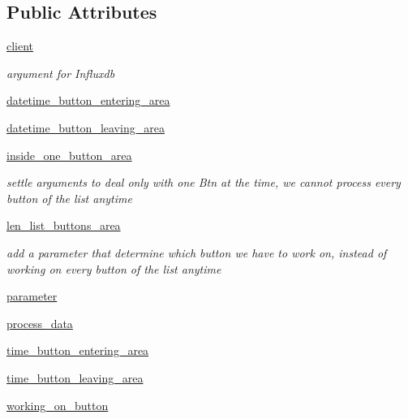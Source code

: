 \subsection*{Public Attributes}
\begin{DoxyCompactItemize}
\item 
\hyperlink{classRET__data__processing_1_1RET__data__processing_ad5bc32b75da65fe60067f501a4bb6665}{client}
\begin{DoxyCompactList}\small\item\em argument for Influxdb \end{DoxyCompactList}\item 
\hyperlink{classRET__data__processing_1_1RET__data__processing_a4dcec67fc65e9336d653ec5078448b8b}{datetime\+\_\+button\+\_\+entering\+\_\+area}
\item 
\hyperlink{classRET__data__processing_1_1RET__data__processing_afe02352070d91e141b0c45450902eea0}{datetime\+\_\+button\+\_\+leaving\+\_\+area}
\item 
\hyperlink{classRET__data__processing_1_1RET__data__processing_af140727efa8da9cde0e592a61407d62f}{inside\+\_\+one\+\_\+button\+\_\+area}
\begin{DoxyCompactList}\small\item\em settle arguments to deal only with one Btn at the time, we cannot process every button of the list anytime \end{DoxyCompactList}\item 
\hyperlink{classRET__data__processing_1_1RET__data__processing_acbbf8e6a1d50b851956b602b4b62407d}{len\+\_\+list\+\_\+buttons\+\_\+area}
\begin{DoxyCompactList}\small\item\em add a parameter that determine which button we have to work on, instead of working on every button of the list anytime \end{DoxyCompactList}\item 
\hyperlink{classRET__data__processing_1_1RET__data__processing_a0d71b5c1dcca8d3fee88d6a11d3e2071}{parameter}
\item 
\hyperlink{classRET__data__processing_1_1RET__data__processing_ae694f95e6ad7f44763d44d68466b8011}{process\+\_\+data}
\item 
\hyperlink{classRET__data__processing_1_1RET__data__processing_ac0425558ab7dcdbba51ca961404b8197}{time\+\_\+button\+\_\+entering\+\_\+area}
\item 
\hyperlink{classRET__data__processing_1_1RET__data__processing_a569f33dfaf2e66a965f1e2bf43ce7bdd}{time\+\_\+button\+\_\+leaving\+\_\+area}
\item 
\hyperlink{classRET__data__processing_1_1RET__data__processing_a96204c1a4417d5a3a980521f8a66a1fa}{working\+\_\+on\+\_\+button}
\end{DoxyCompactItemize}


